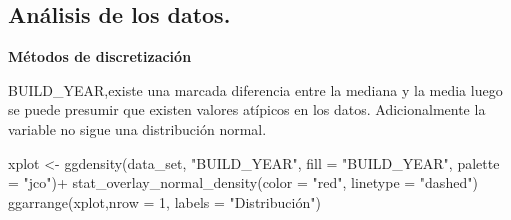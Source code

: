 \documentclass[
]{article}
\newenvironment{Shaded}{\begin{snugshade}}{\end{snugshade}}
\newcommand{\AttributeTok}[1]{\textcolor[rgb]{0.77,0.63,0.00}{#1}}
\newcommand{\DecValTok}[1]{\textcolor[rgb]{0.00,0.00,0.81}{#1}}
\newcommand{\FunctionTok}[1]{\textcolor[rgb]{0.00,0.00,0.00}{#1}}
\newcommand{\NormalTok}[1]{#1}
\newcommand{\OtherTok}[1]{\textcolor[rgb]{0.56,0.35,0.01}{#1}}
\newcommand{\SpecialCharTok}[1]{\textcolor[rgb]{0.00,0.00,0.00}{#1}}
\newcommand{\StringTok}[1]{\textcolor[rgb]{0.31,0.60,0.02}{#1}}
\begin{document}
\begin{Shaded}
\end{Shaded}

\hypertarget{anuxe1lisis-de-los-datos.}{%
\subsection{Análisis de los datos.}\label{anuxe1lisis-de-los-datos.}}

\textbf{Métodos de discretización}

BUILD\_YEAR,existe una marcada diferencia entre la mediana y la media
luego se puede presumir que existen valores atípicos en los datos.
Adicionalmente la variable no sigue una distribución normal.

\begin{Shaded}
\begin{Highlighting}[]
\NormalTok{xplot }\OtherTok{\textless{}{-}} \FunctionTok{ggdensity}\NormalTok{(data\_set, }\StringTok{"BUILD\_YEAR"}\NormalTok{, }\AttributeTok{fill =} \StringTok{"BUILD\_YEAR"}\NormalTok{,}
                   \AttributeTok{palette =} \StringTok{"jco"}\NormalTok{)}\SpecialCharTok{+}
  \FunctionTok{stat\_overlay\_normal\_density}\NormalTok{(}\AttributeTok{color =} \StringTok{"red"}\NormalTok{, }\AttributeTok{linetype =} \StringTok{"dashed"}\NormalTok{)}
\FunctionTok{ggarrange}\NormalTok{(xplot,}\AttributeTok{nrow =} \DecValTok{1}\NormalTok{, }\AttributeTok{labels =} \StringTok{"Distribución"}\NormalTok{) }
\end{Highlighting}
\end{Shaded}
\end{document}
